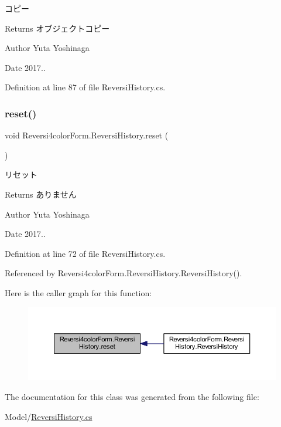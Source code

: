 コピー 

\begin{DoxyReturn}{Returns}
オブジェクトコピー 
\end{DoxyReturn}
\begin{DoxyAuthor}{Author}
Yuta Yoshinaga 
\end{DoxyAuthor}
\begin{DoxyDate}{Date}
2017.. 
\end{DoxyDate}


Definition at line 87 of file Reversi\+History.\+cs.

\mbox{\label{class_reversi4color_form_1_1_reversi_history_a32bee2391a72697e8f9eb68542b70e62}} 
\subsubsection{\texorpdfstring{reset()}{reset()}}
{\footnotesize\ttfamily void Reversi4color\+Form.\+Reversi\+History.\+reset (\begin{DoxyParamCaption}{ }\end{DoxyParamCaption})}



リセット 

\begin{DoxyReturn}{Returns}
ありません 
\end{DoxyReturn}
\begin{DoxyAuthor}{Author}
Yuta Yoshinaga 
\end{DoxyAuthor}
\begin{DoxyDate}{Date}
2017.. 
\end{DoxyDate}


Definition at line 72 of file Reversi\+History.\+cs.



Referenced by Reversi4color\+Form.\+Reversi\+History.\+Reversi\+History().

Here is the caller graph for this function\+:
\nopagebreak
\begin{figure}[H]
\begin{center}
\leavevmode
\includegraphics[width=350pt]{class_reversi4color_form_1_1_reversi_history_a32bee2391a72697e8f9eb68542b70e62_icgraph}
\end{center}
\end{figure}


The documentation for this class was generated from the following file\+:\begin{DoxyCompactItemize}
\item 
Model/\hyperlink{_reversi_history_8cs}{Reversi\+History.\+cs}\end{DoxyCompactItemize}
